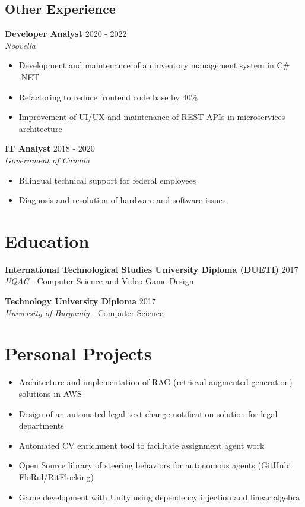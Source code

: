 ﻿\documentclass[11pt,letterpaper]{article}
\begin{document}
\subsection*{Other Experience}

\textbf{Developer Analyst} \hfill 2020 - 2022\\
\textit{Noovelia}
\begin{itemize}
\item Development and maintenance of an inventory management system in C\# .NET
\item Refactoring to reduce frontend code base by 40\%
\item Improvement of UI/UX and maintenance of REST APIs in microservices architecture
\end{itemize}

\textbf{IT Analyst} \hfill 2018 - 2020\\
\textit{Government of Canada}
\begin{itemize}
\item Bilingual technical support for federal employees
\item Diagnosis and resolution of hardware and software issues
\end{itemize}

\section*{Education}
\textbf{International Technological Studies University Diploma (DUETI)} \hfill 2017\\
\textit{UQAC} - Computer Science and Video Game Design

\textbf{Technology University Diploma} \hfill 2017\\
\textit{University of Burgundy} - Computer Science

\section*{Personal Projects}
\begin{itemize}
\item Architecture and implementation of RAG (retrieval augmented generation) solutions in AWS
\item Design of an automated legal text change notification solution for legal departments
\item Automated CV enrichment tool to facilitate assignment agent work
\item Open Source library of steering behaviors for autonomous agents (GitHub: FloRul/RitFlocking)
\item Game development with Unity using dependency injection and linear algebra
\end{itemize}
\end{document}
